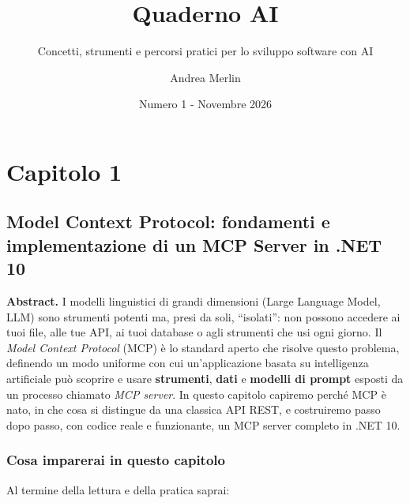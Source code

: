 \documentclass[
  italian,
  10pt,
]{book}
\title{Quaderno AI}
\subtitle{Concetti, strumenti e percorsi pratici per lo sviluppo
software con AI}
\author{Andrea Merlin}
\date{Numero 1 - Novembre 2026}
\begin{document}
\frontmatter
\maketitle

{
\setcounter{tocdepth}{1}
\tableofcontents
}
\mainmatter
\chapter{Capitolo 1}\label{capitolo-1}

\section{Model Context Protocol: fondamenti e implementazione di un MCP
Server in .NET
10}\label{model-context-protocol-fondamenti-e-implementazione-di-un-mcp-server-in-.net-10}

\textbf{Abstract.} I modelli linguistici di grandi dimensioni (Large
Language Model, LLM) sono strumenti potenti ma, presi da soli,
``isolati'': non possono accedere ai tuoi file, alle tue API, ai tuoi
database o agli strumenti che usi ogni giorno. Il \emph{Model Context
Protocol} (MCP) è lo standard aperto che risolve questo problema,
definendo un modo uniforme con cui un'applicazione basata su
intelligenza artificiale può scoprire e usare \textbf{strumenti},
\textbf{dati} e \textbf{modelli di prompt} esposti da un processo
chiamato \emph{MCP server}. In questo capitolo capiremo perché MCP è
nato, in che cosa si distingue da una classica API REST, e costruiremo
passo dopo passo, con codice reale e funzionante, un MCP server completo
in .NET 10.

\subsection{Cosa imparerai in questo
capitolo}\label{cosa-imparerai-in-questo-capitolo}

Al termine della lettura e della pratica saprai:
\end{document}
